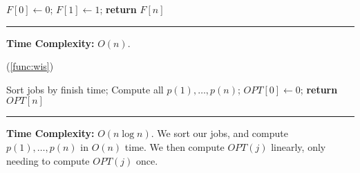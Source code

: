 \begin{Func}

    \vspace{-.5em}
    \begin{algorithm}[H]
        \SetAlgoLined
        $F[0] \gets 0$; $F[1] \gets 1$; 
        \textbf{return} $F[n]$\;
    \end{algorithm}
    \noindent
    \rule{\textwidth}{0.4pt}
    \textbf{Time Complexity:} $O(n)$.
\end{Func}

\newpage 

(\ref{func:wis})
\begin{Func}

    \vspace{-.5em}
    \begin{algorithm}[H]
        \SetAlgoLined
        Sort jobs by finish time; 
        Compute all $p(1),\dots,p(n)$; 
        $OPT[0] \gets 0$; 
        \textbf{return} $OPT[n]$\;
    \end{algorithm}
    \noindent
    \rule{\textwidth}{0.4pt}
    \textbf{Time Complexity:} $O(n\log n)$. We sort our jobs, and compute $p(1),\dots,p(n)$ in $O(n)$ time. We then compute $OPT(j)$ linearly, only needing to compute $OPT(j)$ once.
\end{Func}

